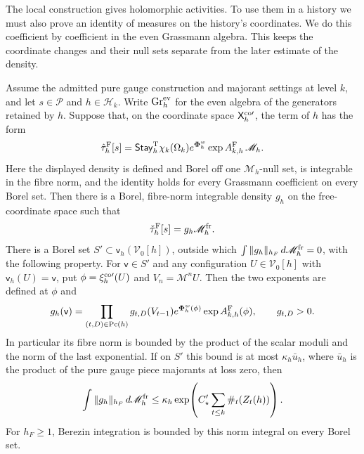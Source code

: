 \documentclass[11pt,letterpaper,reqno]{amsart}
\makeatletter
\theoremstyle{definition}
\newcommand{\ms@minorstart}{%
  \pushQED{\qed}\renewcommand{\qedsymbol}{$\blacksquare$}}
\newenvironment{lemma}[1][]{\ms@minorstart\ms@lemma[#1]}
  {\popQED\endms@lemma}
\theoremstyle{remark}
\makeatother
\begin{document}
The local construction gives holomorphic activities. To use them in a
history we must also prove an identity of measures on the history's
coordinates. We do this coefficient by coefficient in the even
Grassmann algebra. This keeps the coordinate changes and their null
sets separate from the later estimate of the density.

\begin{lemma}[A history density at complex sources]\label{C-407-34}
Assume the admitted pure gauge construction and majorant settings at
level $k$, and let $s\in\mathcal P$ and $h\in\mathcal H_k$.
Write ${\rm Gr}^{\rm ev}_h$ for the even algebra of the generators
retained by $h$. Suppose that, on the coordinate space
$\mathsf X_h^{{\rm co}\prime}$, the term of $h$ has the form
\[
 \hat\tau_h^{\rm F}[s]
 =\mathsf{Stay}^{\rm T}_h\chi_k(\Omega_k)
       e^{\boldsymbol\Phi_h^w}\exp A^{\rm F}_{k,h}\,
       \mathscr M_h .
\]
Here the displayed density is defined and Borel off one
$\mathscr M_h$-null set, is integrable in the fibre norm, and the
identity holds for every Grassmann coefficient on every Borel set.
Then there is a Borel, fibre-norm integrable density $g_h$ on the
free-coordinate space such that
\[
 \check\tau_h^{\rm F}[s]=g_h\mathscr M_h^{\rm fr}.
\]
There is a Borel set $S'\subset\mathsf v_h(\mathcal V_0[h])$,
outside which $\int\|g_h\|_{h_F}\,d\mathscr M_h^{\rm fr}=0$,
with the following property. For $\mathsf v\in S'$ and any
configuration $U\in\mathcal V_0[h]$ with $\mathsf v_h(U)=\mathsf v$,
put $\phi=\xi_h^{{\rm co}\prime}(U)$ and $V_n=\mathcal M^nU$.
Then the two exponents are defined at $\phi$ and
\[
 g_h(\mathsf v)=
 \prod_{(t,D)\in{\rm Pc}(h)}g_{t,D}(V_{t-1})
       e^{\boldsymbol\Phi_h^w(\phi)}
       \exp A^{\rm F}_{k,h}(\phi),\qquad g_{t,D}>0.
\]
In particular its fibre norm is bounded by the product of the scalar
moduli and the norm of the last exponential. If on $S'$ this bound is
at most $\kappa_h\bar u_h$, where $\bar u_h$ is the product of the
pure gauge piece majorants at loss zero, then
\[
 \int\|g_h\|_{h_F}\,d\mathscr M_h^{\rm fr}
 \le\kappa_h\exp\!\left(C'_\star\sum_{t\le k}\#_t(Z_t(h))\right).
\]
For $h_F\ge1$, Berezin integration is bounded by this norm integral
on every Borel set.
\end{lemma}
\end{document}
